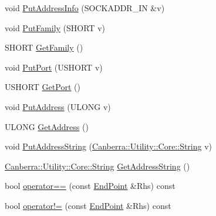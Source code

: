 \begin{DoxyCompactItemize}
\item 
void \hyperlink{class_canberra_1_1_utility_1_1_network_1_1_end_point_a0b103d2d34c15d29efe0e862a2d40742_a0b103d2d34c15d29efe0e862a2d40742}{Put\+Address\+Info} (S\+O\+C\+K\+A\+D\+D\+R\+\_\+\+IN \&v)
\item 
void \hyperlink{class_canberra_1_1_utility_1_1_network_1_1_end_point_aa6e88abb482bf1fe1bbf5e0283a6acf8_aa6e88abb482bf1fe1bbf5e0283a6acf8}{Put\+Family} (S\+H\+O\+RT v)
\item 
S\+H\+O\+RT \hyperlink{class_canberra_1_1_utility_1_1_network_1_1_end_point_aa39fe8e11e2dc2bff4aaa8f76a0d8d93_aa39fe8e11e2dc2bff4aaa8f76a0d8d93}{Get\+Family} ()
\item 
void \hyperlink{class_canberra_1_1_utility_1_1_network_1_1_end_point_a7870ced30d9d124ae3fa40e5964f1c29_a7870ced30d9d124ae3fa40e5964f1c29}{Put\+Port} (U\+S\+H\+O\+RT v)
\item 
U\+S\+H\+O\+RT \hyperlink{class_canberra_1_1_utility_1_1_network_1_1_end_point_a5494dfb63773cb639455534cdbdabd54_a5494dfb63773cb639455534cdbdabd54}{Get\+Port} ()
\item 
void \hyperlink{class_canberra_1_1_utility_1_1_network_1_1_end_point_a7f32b1d857849acabb17f77d7cb37cb2_a7f32b1d857849acabb17f77d7cb37cb2}{Put\+Address} (U\+L\+O\+NG v)
\item 
U\+L\+O\+NG \hyperlink{class_canberra_1_1_utility_1_1_network_1_1_end_point_a149e4a7a23b4285d2f4752776679fc08_a149e4a7a23b4285d2f4752776679fc08}{Get\+Address} ()
\item 
void \hyperlink{class_canberra_1_1_utility_1_1_network_1_1_end_point_a78be3280aea4be4926ff32a76e0758b8_a78be3280aea4be4926ff32a76e0758b8}{Put\+Address\+String} (\hyperlink{class_canberra_1_1_utility_1_1_core_1_1_string}{Canberra\+::\+Utility\+::\+Core\+::\+String} v)
\item 
\hyperlink{class_canberra_1_1_utility_1_1_core_1_1_string}{Canberra\+::\+Utility\+::\+Core\+::\+String} \hyperlink{class_canberra_1_1_utility_1_1_network_1_1_end_point_ae2c218f6bc7af23d526d9f7fd581a847_ae2c218f6bc7af23d526d9f7fd581a847}{Get\+Address\+String} ()
\item 
bool \hyperlink{class_canberra_1_1_utility_1_1_network_1_1_end_point_a3ab49b2b46bd18c7633fcd94e8246c67_a3ab49b2b46bd18c7633fcd94e8246c67}{operator==} (const \hyperlink{class_canberra_1_1_utility_1_1_network_1_1_end_point}{End\+Point} \&Rhs) const
\item 
bool \hyperlink{class_canberra_1_1_utility_1_1_network_1_1_end_point_ab93ff46c491c6b065c2610f6a2443886_ab93ff46c491c6b065c2610f6a2443886}{operator!=} (const \hyperlink{class_canberra_1_1_utility_1_1_network_1_1_end_point}{End\+Point} \&Rhs) const
\end{DoxyCompactItemize}

